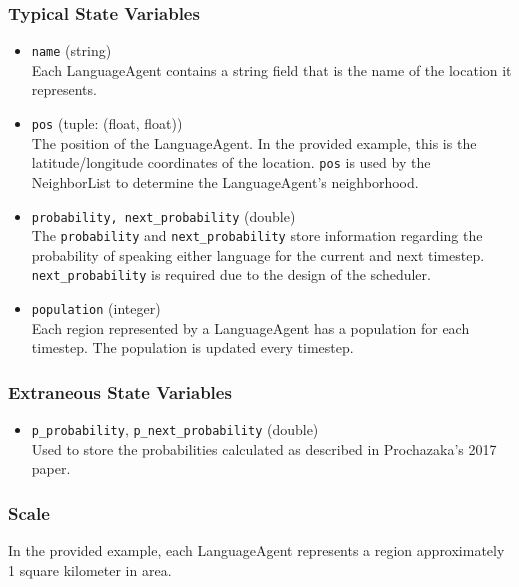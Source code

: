 \documentclass{article}
\begin{document}
\subsubsection{Typical State Variables}
\begin{itemize}
\item \texttt{name} (string)\\
Each LanguageAgent contains a string field that is the name of the location it represents.

\item \texttt{pos} (tuple: (float, float)) \\
The position of the LanguageAgent. In the provided example, this is the latitude/longitude coordinates of the location. \texttt{pos} is used by the NeighborList to determine the LanguageAgent's neighborhood.

\item \texttt{probability, next\_probability} (double) \\
The \texttt{probability} and \texttt{next\_probability} store information regarding the probability of speaking either language for the current and next timestep. \texttt{next\_probability} is required due to the design of the scheduler.

\item \texttt{population} (integer) \\
Each region represented by a LanguageAgent has a population for each timestep. The population is updated every timestep.

\end{itemize}

\subsubsection{Extraneous State Variables}
\begin{itemize}
\item \texttt{p\_probability}, \texttt{p\_next\_probability} (double) \\
Used to store the probabilities calculated as described in Prochazaka's 2017 paper.

\end{itemize}

\subsubsection{Scale}

In the provided example, each LanguageAgent represents a region approximately 1 square kilometer in area.
\end{document}
